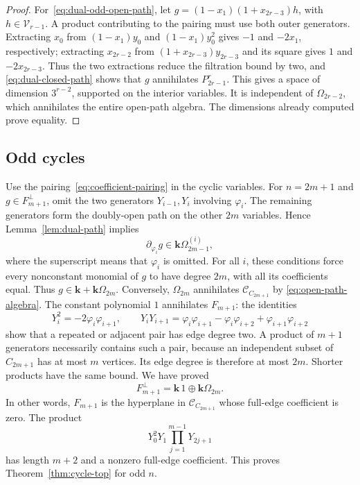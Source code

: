 \documentclass[reqno]{article}
\theoremstyle{plain} %
\theoremstyle{definition}
\theoremstyle{remark}
\newcommand{\K} {\mathbf{k}}
\newcommand {\CC}{\mathscr{C}}
\numberwithin{equation}{section}
\begin{document}
\begin{proof}
For~\eqref{eq:dual-odd-open-path}, let
$g=(1-x_1)(1+x_{2r-3})h$, with $h\in\mathcal V_{r-1}$.
A product contributing to the pairing must use both outer generators.
Extracting $x_0$ from $(1-x_1)y_0$ and $(1-x_1)y_0^2$ gives
$-1$ and $-2x_1$, respectively; extracting $x_{2r-2}$ from
$(1+x_{2r-3})y_{2r-3}$ and its square gives $1$ and $-2x_{2r-3}$.
Thus the two extractions reduce the filtration bound by two, and
\eqref{eq:dual-closed-path} shows that $g$ annihilates $P_{2r-1}^r$.
This gives a space of dimension $3^{r-2}$, supported on the interior
variables. It is independent of $\Omega_{2r-2}$, which annihilates the
entire open-path algebra. The dimensions already computed prove equality.
\end{proof}

\subsection{Odd cycles}
\label{sec:odd-cycles}

Use the pairing~\eqref{eq:coefficient-pairing} in the cyclic variables.
For $n=2m+1$ and $g\in F_{m+1}^\perp$, omit the two generators
$Y_{i-1},Y_i$ involving $\varphi_i$. The remaining generators form the
doubly-open path on the other $2m$ variables. Hence
Lemma~\ref{lem:dual-path} implies
\[
\partial_{\varphi_i}g\in\K\Omega_{2m-1}^{(i)},
\]
where the superscript means that $\varphi_i$ is omitted.
For all $i$, these conditions force every nonconstant monomial of $g$
to have degree $2m$, with all its coefficients equal. Thus
$g\in\K+\K\Omega_{2m}$.
Conversely, $\Omega_{2m}$ annihilates $\CC_{C_{2m+1}}$ by
\eqref{eq:open-path-algebra}. The constant polynomial $1$ annihilates
$F_{m+1}$: the identities
\begin{equation}\label{eq:cycle-adjacent-products}
Y_i^2=-2\varphi_i\varphi_{i+1},\qquad
Y_iY_{i+1}=\varphi_i\varphi_{i+1}-\varphi_i\varphi_{i+2}
                         +\varphi_{i+1}\varphi_{i+2}
\end{equation}
show that a repeated or adjacent pair has edge degree two. A product of
$m+1$ generators necessarily contains such a pair, because an independent
subset of $C_{2m+1}$ has at most $m$ vertices. Its edge degree is therefore
at most $2m$. Shorter products have the same bound. We have proved
\begin{equation}\label{eq:odd-cycle-annihilator}
F_{m+1}^\perp=\K\,1\oplus\K\Omega_{2m}.
\end{equation}
In other words, $F_{m+1}$ is the hyperplane in $\CC_{C_{2m+1}}$ whose
full-edge coefficient is zero. The product
\[
Y_0^2Y_1\prod_{j=1}^{m-1}Y_{2j+1}
\]
has length $m+2$ and a nonzero full-edge coefficient. This proves
Theorem~\ref{thm:cycle-top} for odd $n$.
\end{document}
